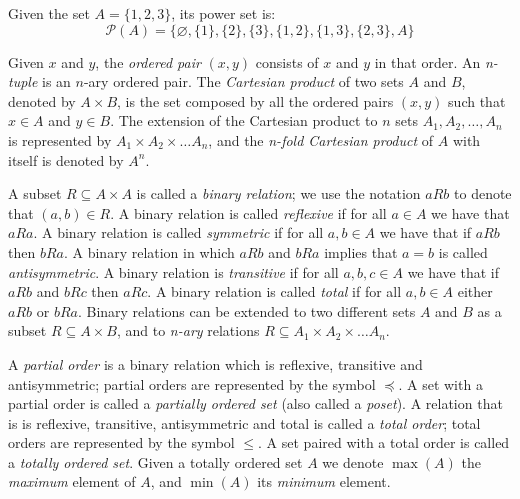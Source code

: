 \begin{example}
Given the set $A = \{1, 2, 3\}$, its power set is:
\[
\mathcal{P}(A) = \{\varnothing, \{1\}, \{2\}, \{3\}, \{1,2\}, \{1,3\}, \{2,3\}, A\}
\]
\end{example}


Given $x$ and $y$, the \emph{ordered pair} $\left(x, y\right)$ consists of $x$ and $y$ in that order. An \emph{n-tuple} is an $n$-ary ordered pair. The \emph{Cartesian product} of two sets $A$ and $B$, denoted by $A \times B$, is the set composed by all the ordered pairs $\left(x, y\right)$ such that $x \in A$ and $y \in B$. The extension of the Cartesian product to $n$ sets $A_1, A_2, \dots, A_n$ is represented by $A_1 \times A_2 \times \dots A_n$, and the \emph{n-fold Cartesian product} of $A$ with itself is denoted by $A^n$.

A subset $R \subseteq A \times A$ is called a \emph{binary relation}; we use the notation $aRb$ to denote that $\left(a, b\right) \in R$. A binary relation is called \emph{reflexive} if for all $a \in A$ we have that $aRa$. A binary relation is called \emph{symmetric} if for all $a, b \in A$ we have that if $aRb$ then $bRa$. A binary relation in which $aRb$ and $bRa$ implies that $a = b$ is called \emph{antisymmetric}. A binary relation is \emph{transitive} if for all $a, b, c \in A$ we have that if $aRb$ and $bRc$ then $aRc$. A binary relation is called \emph{total} if for all $a, b \in A$ either $aRb$ or $bRa$. Binary relations can be extended to two different sets $A$ and $B$ as a subset $R \subseteq A \times B$, and to \emph{n-ary} relations $R \subseteq A_1 \times A_2 \times \dots A_n$.

A \emph{partial order} is a binary relation which is reflexive, transitive and antisymmetric; partial orders are represented by the symbol $\preceq$. A set with a partial order is called a \emph{partially ordered set} (also called a \emph{poset}). A relation that is is reflexive, transitive, antisymmetric and total is called a \emph{total order}; total orders are represented by the symbol $\leq$. A set paired with a total order is called a \emph{totally ordered set}. Given a totally ordered set $A$ we denote $\max(A)$ the \emph{maximum} element of $A$, and $\min(A)$ its \emph{minimum} element.

